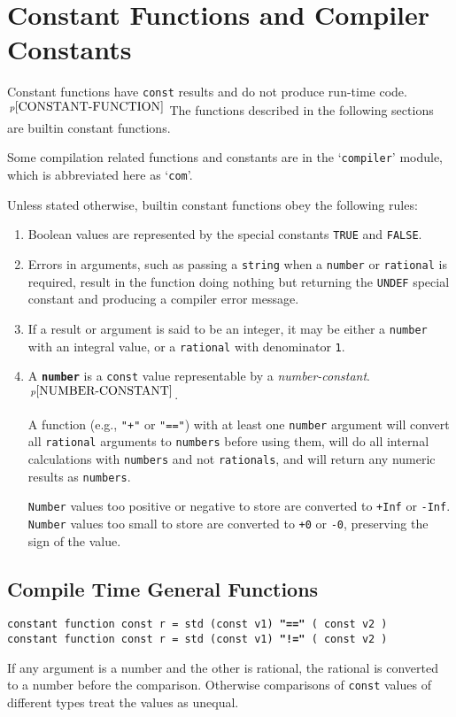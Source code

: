 \documentclass[12pt]{article}
\newcommand{\ttkey}[1]{{\tt \bfseries #1}}
\newcommand{\pagnote}[1]{$\,^{p\pageref{#1}}$}
\newenvironment{indpar}[1][0.3in]%
	{\begin{list}{}%
		     {\setlength{\itemsep}{0in}%
		      \setlength{\topsep}{0in}%
		      \setlength{\parsep}{1ex}%
		      \setlength{\labelwidth}{#1}%
		      \setlength{\leftmargin}{#1}%
		      \addtolength{\leftmargin}{\labelsep}}%
	 \item}%
	{\end{list}}
\begin{document}
\section{Constant Functions and Compiler Constants}

Constant functions have {\tt const} results
and do not produce run-time code.\pagnote{CONSTANT-FUNCTION}
The functions described in the
following sections are builtin constant functions.

Some compilation related functions and
constants are in the `{\tt compiler}' module,
which is abbreviated here as `{\tt com}'.

Unless stated otherwise, builtin constant functions
obey the following rules:
\begin{enumerate}
\item
Boolean values are represented by the special constants
{\tt TRUE} and {\tt FALSE}.
\item
Errors in arguments, such as passing a {\tt string} when a
{\tt number} or {\tt rational} is required, result in the
function doing nothing but returning
the {\tt UNDEF} special constant and producing
a compiler error message.
\item
If a result or argument is said to be an integer, it may
be either a {\tt number} with an integral value, or a
{\tt rational} with denominator {\tt 1}.
\item
A \ttkey{number} is a {\tt const} value representable by a
{\em number-constant}.\pagnote{NUMBER-CONSTANT}.

A function (e.g., {\tt "+"} or {\tt "=="})
with at least one {\tt number} argument will
convert all {\tt rational} arguments to {\tt numbers}
before using them, will do all internal calculations with
{\tt numbers} and not {\tt rationals},
and will return any numeric results as {\tt numbers}.

{\tt Number} values too positive or negative to store
are converted to {\tt +Inf} or {\tt -Inf}.
{\tt Number} values too small to store
are converted to {\tt +0} or {\tt -0}, preserving the
sign of the value.
\end{enumerate}

\subsection{Compile Time General Functions}

{\tt constant function const r = std (const v1) \ttkey{"=="} ( const v2 )} \\
{\tt constant function const r = std (const v1) \ttkey{"!="} ( const v2 )}
\begin{indpar}
If any argument is a number and the other is rational,
the rational is converted to a number before the comparison.
Otherwise comparisons of {\tt const} values of different types treat
the values as unequal.
\end{indpar}
\end{document}
